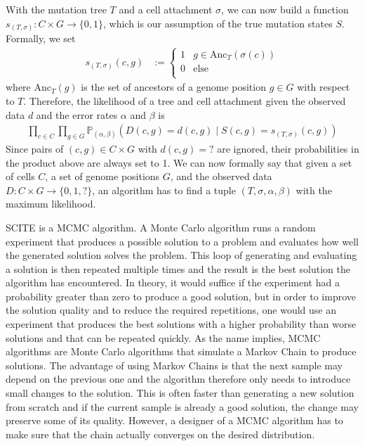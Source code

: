 With the mutation tree $T$ and a cell attachment $\sigma$, we can now build a function $s_{(T, \sigma)}: C \times G \rightarrow \{0, 1\}$, which is our assumption of the true mutation states $S$. Formally, we set
\begin{align*}
    s_{(T, \sigma)}(c, g) &:= \begin{cases}
        1 & g \in \mathrm{Anc}_T(\sigma(c)) \\
        0 & \text{else} \\
    \end{cases}
\end{align*}
where $\mathrm{Anc}_T(g)$ is the set of ancestors of a genome position $g \in G$ with respect to $T$. Therefore, the likelihood of a tree and cell attachment given the observed data $d$ and the error rates $\alpha$ and $\beta$ is
\begin{align*}
    \prod_{c \in C}\prod_{g \in G} \mathbb{P}_{(\alpha, \beta)}(D(c, g) = d(c, g) \mid S(c, g) = s_{(T, \sigma)}(c, g))
\end{align*}
Since pairs of $(c, g) \in C \times G$ with $d(c, g) = ?$ are ignored, their probabilities in the product above are always set to 1. We can now formally say that given a set of cells $C$, a set of genome positions $G$, and the observed data $D: C \times G \rightarrow \{0, 1, ?\}$, an algorithm has to find a tuple $(T, \sigma, \alpha, \beta)$ with the maximum likelihood.

\ac{SCITE} is a \ac{MCMC} algorithm. A Monte Carlo algorithm runs a random experiment that produces a possible solution to a problem and evaluates how well the generated solution solves the problem. This loop of generating and evaluating a solution is then repeated multiple times and the result is the best solution the algorithm has encountered. In theory, it would suffice if the experiment had a probability greater than zero to produce a good solution, but in order to improve the solution quality and to reduce the required repetitions, one would use an experiment that produces the best solutions with a higher probability than worse solutions and that can be repeated quickly. As the name implies, \ac{MCMC} algorithms are Monte Carlo algorithms that simulate a Markov Chain to produce solutions. The advantage of using Markov Chains is that the next sample may depend on the previous one and the algorithm therefore only needs to introduce small changes to the solution. This is often faster than generating a new solution from scratch and if the current sample is already a good solution, the change may preserve some of its quality. However, a designer of a \ac{MCMC} algorithm has to make sure that the chain actually converges on the desired distribution.

